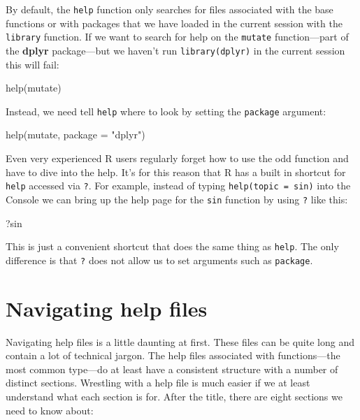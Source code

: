 \documentclass[
]{book}
\newenvironment{Shaded}{\begin{snugshade}}{\end{snugshade}}
\newcommand{\AttributeTok}[1]{\textcolor[rgb]{0.77,0.63,0.00}{#1}}
\newcommand{\FunctionTok}[1]{\textcolor[rgb]{0.00,0.00,0.00}{#1}}
\newcommand{\NormalTok}[1]{#1}
\newcommand{\StringTok}[1]{\textcolor[rgb]{0.31,0.60,0.02}{#1}}
\begin{document}
By default, the \texttt{help} function only searches for files associated with the base functions or with packages that we have loaded in the current session with the \texttt{library} function. If we want to search for help on the \texttt{mutate} function---part of the \textbf{dplyr} package---but we haven't run \texttt{library(dplyr)} in the current session this will fail:

\begin{Shaded}
\begin{Highlighting}[]
\FunctionTok{help}\NormalTok{(mutate)}
\end{Highlighting}
\end{Shaded}

Instead, we need tell \texttt{help} where to look by setting the \texttt{package} argument:

\begin{Shaded}
\begin{Highlighting}[]
\FunctionTok{help}\NormalTok{(mutate, }\AttributeTok{package =} \StringTok{"dplyr"}\NormalTok{)}
\end{Highlighting}
\end{Shaded}

Even very experienced R users regularly forget how to use the odd function and have to dive into the help. It's for this reason that R has a built in shortcut for \texttt{help} accessed via \texttt{?}. For example, instead of typing \texttt{help(topic\ =\ sin)} into the Console we can bring up the help page for the \texttt{sin} function by using \texttt{?} like this:

\begin{Shaded}
\begin{Highlighting}[]
\NormalTok{?sin}
\end{Highlighting}
\end{Shaded}

This is just a convenient shortcut that does the same thing as \texttt{help}. The only difference is that \texttt{?} does not allow us to set arguments such as \texttt{package}.

\hypertarget{nav-help}{%
\section{Navigating help files}\label{nav-help}}

Navigating help files is a little daunting at first. These files can be quite long and contain a lot of technical jargon. The help files associated with functions---the most common type---do at least have a consistent structure with a number of distinct sections. Wrestling with a help file is much easier if we at least understand what each section is for. After the title, there are eight sections we need to know about:
\end{document}
